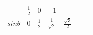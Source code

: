 {\begin{center}
\begin{xtabular*}{\mytablewidth}[t]{|p{10\mystarwidth}|p{10\mystarwidth}|p{10\mystarwidth}|p{10\mystarwidth}|p{10\mystarwidth}|p{10\mystarwidth}|p{10\mystarwidth}|}
               &
                \begin{math}\frac{1}{2}\end{math}
               &
        0 &
                \begin{math}-1\end{math}
     \tabularnewline{}
                \begin{math}sin\theta \end{math}
               &
        0 &
                \begin{math}\frac{1}{2}\end{math}
               &
                \begin{math}\frac{1}{\sqrt{2}}\end{math}
               &
                \begin{math}\frac{\sqrt{3}}{2}\end{math}
               &

\end{xtabular*}
\end{center}}
